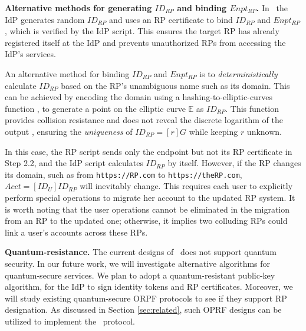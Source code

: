 \noindent \textbf{Alternative methods for generating $ID_{RP}$ and binding $Enpt_{RP}$.}
In \usso\ the IdP generates random $ID_{RP}$ and uses an RP certificate to bind $ID_{RP}$ and $Enpt_{RP}$, which is verified by the IdP script.
This ensures the target RP has already registered itself at the IdP and prevents unauthorized RPs from accessing the IdP's services.

An alternative method for binding $ID_{RP}$ and $Enpt_{RP}$ is
 to \emph{deterministically} calculate $ID_{RP}$ based on the RP's unambiguous name such as its domain.
 This can be achieved by encoding the domain using a hashing-to-elliptic-curves function \cite{irtf-cfrg-hash-to-curve-16},
  to generate a point on the elliptic curve $\mathbb{E}$ as $ID_{RP}$.
This function provides collision resistance
 and does not reveal the discrete logarithm of the output \cite{irtf-cfrg-hash-to-curve-16},
  ensuring the \emph{uniqueness} of $ID_{RP} = [r]G$ while keeping $r$ unknown. %

In this case, the RP script sends only the endpoint but not its RP certificate in Step 2.2, and the IdP script calculates $ID_{RP}$ by itself. %
However, if the RP changes its domain, such as from \verb+https://RP.com+ to \verb+https://theRP.com+,
$Acct = [ID_U]ID_{RP}$ will inevitably change.
This requires each user to explicitly perform special operations to migrate her account to the updated RP system.
It is worth noting that the user operations cannot be eliminated in the migration from an RP to the updated one;
otherwise, it implies two colluding RPs could link a user's accounts across these RPs.

\newc
\noindent \textbf{Quantum-resistance.}
The current designs of \usso\ does not support quantum security.
In our future work, we will investigate alternative algorithms for quantum-secure services.
We plan to adopt a quantum-resistant public-key algorithm, for the IdP to sign identity tokens and RP certificates.
Moreover, we will study existing quantum-secure ORPF protocols \cite{ideal-lattice-oprf,isogency-oprf}
 to see if they support RP designation.
As discussed in Section \ref{sec:related}, such OPRF designs can be utilized to implement the \usso\ protocol.

